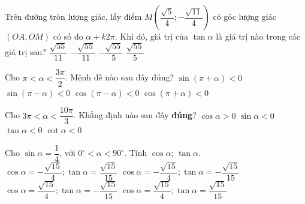 \begin{ex}%
	Trên đường tròn lượng giác, lấy điểm $M\left(\dfrac{\sqrt{5}}{4};-\dfrac{\sqrt{11}}{4} \right)$ có góc lượng giác $(OA,OM)$ có số đo $\alpha+k2\pi$. Khi đó, giá trị của $\tan \alpha$ là giá trị  nào trong các giá trị sau?
	\choice 
		 {$\dfrac{\sqrt{55}}{11}$}
		{$-\dfrac{\sqrt{55}}{11}$} 
		 {\True $-\dfrac{\sqrt{55}}{5}$}
		 {$\dfrac{\sqrt{55}}{5}$}
\end{ex}

\begin{ex}%
	Cho  $\pi <\alpha <\dfrac{3\pi}{2}$. Mệnh đề nào sau đây đúng?
	\choice 
		{$\sin (\pi  +\alpha)<0$}
		 {\True $\sin (\pi -\alpha)<0$}
		{$\cos (\pi  -\alpha)<0$}
		{$\cos (\pi +\alpha)<0$} 
\end{ex}

\begin{ex}%
	Cho $3\pi < \alpha < \dfrac{10\pi}{3}$. Khẳng  định nào sau đây \textbf{đúng}?
	 \choice
		{$\cos  \alpha > 0$}
		{\True $\sin  \alpha < 0$}
		 {$\tan \alpha < 0$}
		{$\cot \alpha < 0$} 
\end{ex}

\begin{ex}%
	Cho $\sin \alpha=\dfrac{1}{4}$, với $0^\circ< \alpha < 90^\circ$. Tính $\cos \alpha$; $\tan \alpha$. 
	 \choice
		{$\cos  \alpha=-\dfrac{\sqrt{15}}{4};\tan \alpha=\dfrac{\sqrt{15}}{15}$}
		{$\cos \alpha=-\dfrac{\sqrt{15}}{4};\tan  \alpha=-\dfrac{\sqrt{15}}{15}$}
		{$\cos \alpha=\dfrac{\sqrt{15}}{4};\tan \alpha=-\dfrac{\sqrt{15}}{15}$} 
		 {\True $\cos \alpha=\dfrac{\sqrt{15}}{4};\tan \alpha=\dfrac{\sqrt{15}}{15}$}
\end{ex}

